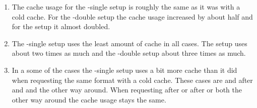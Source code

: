 \documentclass[twoside,openright]{uva-bachelor-thesis}
\begin{document}
\begin{enumerate}
    \item The cache usage for the \lt-single setup is roughly the same as it was
        with a cold cache. For the \lt-double setup the cache usage increased by
        about half and for the \cdn setup it almost doubled.

    \item The \lt-single setup uses the least amount of cache in all cases. The
        \cdn setup uses about two times as much and the \lt-double setup about
        three times as much.

    \item In a some of the cases the \lt-single setup uses a bit more cache than
        it did when requesting the same format with a cold cache. These cases
        are \hds and \hls after \dash and \iss and the other way around.  When
        requesting \dash after \iss or \hls after \hds or both the other way
        around the cache usage stays the same.

\end{enumerate}

\FloatBarrier
\end{document}
